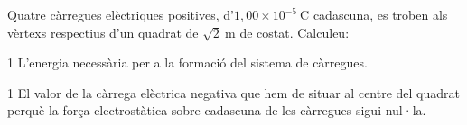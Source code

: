 Quatre càrregues elèctriques positives, d'$1,00\times 10^{-5}\ \mathrm{C}$ cadascuna, es troben als vèrtexs respectius d'un quadrat de $\sqrt{2}\ \mathrm{m}$ de costat. Calculeu:

\begin{apartat}{1}
L'energia necessària per a la formació del sistema de càrregues.
\end{apartat}

\begin{apartat}{1}
El valor de la càrrega elèctrica negativa que hem de situar al centre del quadrat perquè la força electrostàtica sobre cadascuna de les càrregues sigui nul·la.
\end{apartat}

